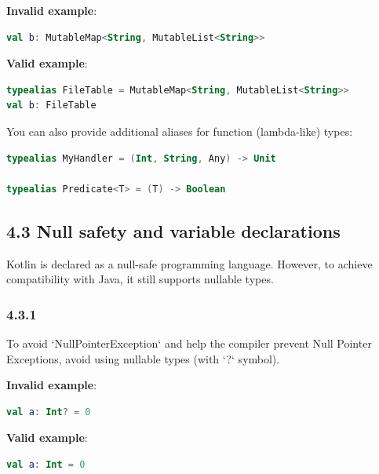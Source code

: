 {{{{\textbf{Invalid example}:

\begin{lstlisting}[language=Kotlin]
val b: MutableMap<String, MutableList<String>>
\end{lstlisting}


\textbf{Valid example}:

\begin{lstlisting}[language=Kotlin]
typealias FileTable = MutableMap<String, MutableList<String>>
val b: FileTable
\end{lstlisting}


You can also provide additional aliases for function (lambda-like) types:

\begin{lstlisting}[language=Kotlin]
typealias MyHandler = (Int, String, Any) -> Unit

typealias Predicate<T> = (T) -> Boolean
\end{lstlisting}


\subsection*{\textbf{4.3 Null safety and variable declarations}}

\label{sec:4.3}

Kotlin is declared as a null-safe programming language. However, to achieve compatibility with Java, it still supports nullable types.



\subsubsection*{\textbf{4.3.1}}
\leavevmode\newline

\label{sec:4.3.1}

To avoid `NullPointerException` and help the compiler prevent Null Pointer Exceptions, avoid using nullable types (with `?` symbol).



\textbf{Invalid example}:

\begin{lstlisting}[language=Kotlin]
val a: Int? = 0
\end{lstlisting}


\textbf{Valid example}:

\begin{lstlisting}[language=Kotlin]
val a: Int = 0
\end{lstlisting}


}}}}
